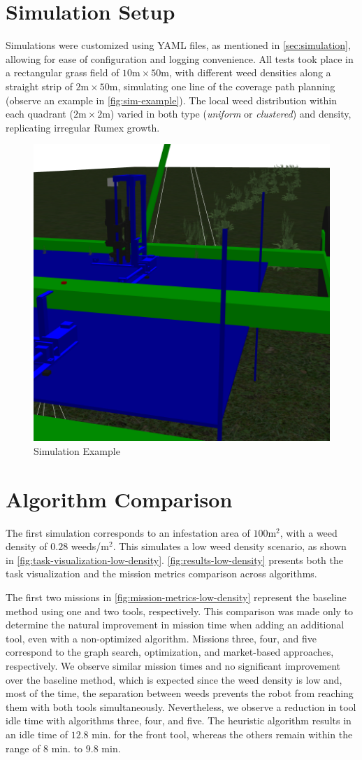\section{Simulation Setup}
Simulations were customized using YAML files, as mentioned in \autoref{sec:simulation}, allowing for ease of configuration and logging convenience. All tests took place in a rectangular grass field of $10\text{m} \times 50\text{m}$, with different weed densities along a straight strip of $2\text{m} \times 50\text{m}$, simulating one line of the coverage path planning (observe an example in \autoref{fig:sim-example}). The local weed distribution within each quadrant ($2\text{m} \times 2\text{m}$) varied in both type (\textit{uniform} or \textit{clustered}) and density, replicating irregular Rumex growth. 

\begin{figure}[hbt]
    \centering
    \includegraphics[width=0.5\linewidth]{gfx/ch04/field_strip_path_2.png}
    \caption{Simulation Example}
    \label{fig:sim-example}
\end{figure}

\section{Algorithm Comparison}
The first simulation corresponds to an infestation area of $100\text{m}^2$, with a weed density of $0.28$ weeds/m$^2$. This simulates a low weed density scenario, as shown in \autoref{fig:task-visualization-low-density}. \autoref{fig:results-low-density} presents both the task visualization and the mission metrics comparison across algorithms. 

The first two missions in \autoref{fig:mission-metrics-low-density} represent the baseline method using one and two tools, respectively. This comparison was made only to determine the natural improvement in mission time when adding an additional tool, even with a non-optimized algorithm. Missions three, four, and five correspond to the graph search, optimization, and market-based approaches, respectively. We observe similar mission times and no significant improvement over the baseline method, which is expected since the weed density is low and, most of the time, the separation between weeds prevents the robot from reaching them with both tools simultaneously. Nevertheless, we observe a reduction in tool idle time with algorithms three, four, and five. The heuristic algorithm results in an idle time of $12.8$ min. for the front tool, whereas the others remain within the range of $8$ min. to $9.8$ min.

